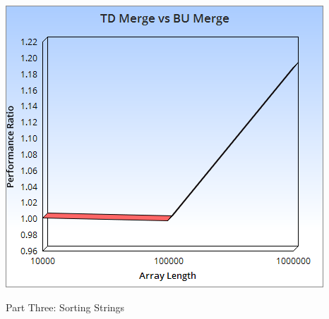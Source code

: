 \documentclass{article}
\begin{document}
\includegraphics[scale=0.5]{Integer4.png}
\newpage
\begin{center}
Part Three: Sorting Strings
\end{center}
\end{document}

